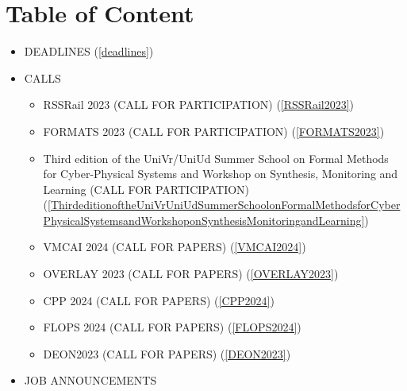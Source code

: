 \documentclass[prodmode,acmtecs]{acmsmall} %
\begin{document}
\section{Table of Content}\begin{itemize}\item DEADLINES (\cref{deadlines}) 
 
\item CALLS 
 
\begin{itemize}\item RSSRail 2023 (CALL FOR PARTICIPATION) (\cref{RSSRail2023})
\item FORMATS 2023 (CALL FOR PARTICIPATION) (\cref{FORMATS2023})
\item Third edition of the UniVr/UniUd Summer School on Formal Methods for Cyber-Physical Systems and Workshop on Synthesis, Monitoring and Learning (CALL FOR PARTICIPATION) (\cref{ThirdeditionoftheUniVrUniUdSummerSchoolonFormalMethodsforCyberPhysicalSystemsandWorkshoponSynthesisMonitoringandLearning})
\item VMCAI 2024 (CALL FOR PAPERS) (\cref{VMCAI2024})
\item OVERLAY 2023 (CALL FOR PAPERS) (\cref{OVERLAY2023})
\item CPP 2024 (CALL FOR PAPERS) (\cref{CPP2024})
\item FLOPS 2024 (CALL FOR PAPERS) (\cref{FLOPS2024})
\item DEON2023 (CALL FOR PAPERS) (\cref{DEON2023})
\end{itemize} 
\item JOB ANNOUNCEMENTS 
 

\end{itemize}
\end{document}
